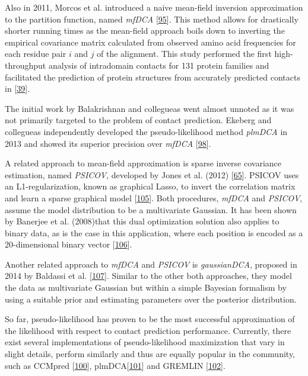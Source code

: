 \documentclass[11pt,a4paper,twoside]{book}
\theoremstyle{definition}
\theoremstyle{definition}
\theoremstyle{remark}
\begin{document}
Also in 2011, Morcos et al. introduced a naive mean-field inversion
approximation to the partition function, named \emph{mfDCA}
{[}\protect\hyperlink{ref-Morcos2011}{95}{]}. This method allows for
drastically shorter running times as the mean-field approach boils down
to inverting the empirical covariance matrix calculated from observed
amino acid frequencies for each residue pair \(i\) and \(j\) of the
alignment. This study performed the first high-throughput analysis of
intradomain contacts for 131 protein families and facilitated the
prediction of protein structures from accurately predicted contacts in
{[}\protect\hyperlink{ref-Marks2011}{39}{]}.

The initial work by Balakrishnan and collegueas went almost unnoted as
it was not primarily targeted to the problem of contact prediction.
Ekeberg and collegueas independently developed the pseudo-likelihood
method \emph{plmDCA} in 2013 and showed its superior precision over
\emph{mfDCA} {[}\protect\hyperlink{ref-Ekeberg2013}{98}{]}.

A related approach to mean-field approximation is sparse inverse
covariance estimation, named \emph{PSICOV}, developed by Jones et al.
(2012) {[}\protect\hyperlink{ref-Jones2012}{65}{]}. PSICOV uses an
L1-regularization, known as graphical Lasso, to invert the correlation
matrix and learn a sparse graphical model
{[}\protect\hyperlink{ref-Friedman2008}{105}{]}. Both procedures,
\emph{mfDCA} and \emph{PSICOV}, assume the model distribution to be a
multivariate Gaussian. It has been shown by Banerjee et al. (2008)that
this dual optimization solution also applies to binary data, as is the
case in this application, where each position is encoded as a
20-dimensional binary vector
{[}\protect\hyperlink{ref-Banerjee2008}{106}{]}.

Another related approach to \emph{mfDCA} and \emph{PSICOV} is
\emph{gaussianDCA}, proposed in 2014 by Baldassi et al.
{[}\protect\hyperlink{ref-Baldassi2014}{107}{]}. Similar to the other
both approaches, they model the data as multivariate Gaussian but within
a simple Bayesian formalism by using a suitable prior and estimating
parameters over the posterior distribution.

So far, pseudo-likelihood has proven to be the most successful
approximation of the likelihood with respect to contact prediction
performance. Currently, there exist several implementations of
pseudo-likelihood maximization that vary in slight details, perform
similarly and thus are equally popular in the community, such as CCMpred
{[}\protect\hyperlink{ref-Seemayer2014}{100}{]},
plmDCA{[}\protect\hyperlink{ref-Ekeberg2014}{101}{]} and GREMLIN
{[}\protect\hyperlink{ref-Kamisetty2013}{102}{]}.
\end{document}
